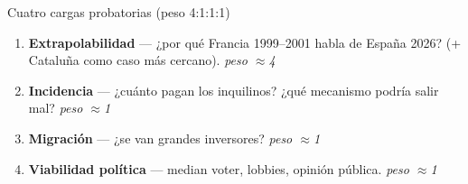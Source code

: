 \documentclass[aspectratio=169,11pt]{beamer}
\begin{document}
\begin{frame}{Cuatro cargas probatorias (peso 4{:}1{:}1{:}1)}
  \begin{enumerate}\setlength\itemsep{0.7em}
    \item[\textbf{1.}] \textbf{Extrapolabilidad} --- ¿por qué Francia 1999--2001 habla de España 2026?
          (+ Cataluña como caso más cercano). \hfill {\color{ambar}\textit{peso $\approx$4}}
    \item[\textbf{2.}] \textbf{Incidencia} --- ¿cuánto pagan los inquilinos? ¿qué mecanismo podría salir mal?
          \hfill {\color{gray}\textit{peso $\approx$1}}
    \item[\textbf{3.}] \textbf{Migración} --- ¿se van grandes inversores?
          \hfill {\color{gray}\textit{peso $\approx$1}}
    \item[\textbf{4.}] \textbf{Viabilidad política} --- median voter, lobbies, opinión pública.
          \hfill {\color{gray}\textit{peso $\approx$1}}
  \end{enumerate}
\end{frame}
\end{document}
